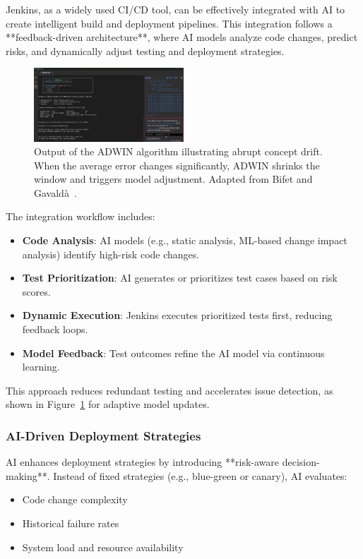\documentclass[manuscript,screen,review]{acmart}
\begin{document}
Jenkins, as a widely used CI/CD tool, can be effectively integrated with AI to create intelligent build and deployment pipelines. This integration follows a **feedback-driven architecture**, where AI models analyze code changes, predict risks, and dynamically adjust testing and deployment strategies.

\begin{figure}[H]
  \centering
  \includegraphics[width=0.5\textwidth]{picture/jenkins+ai+cursor.pdf}
  \caption{Output of the ADWIN algorithm illustrating abrupt concept drift. When the average error changes significantly, ADWIN shrinks the window and triggers model adjustment. Adapted from Bifet and Gavaldà~\cite{Bifet2007}.}
  \label{fig:adwin}
\end{figure}

The integration workflow includes:
\begin{itemize}
    \item \textbf{Code Analysis}: AI models (e.g., static analysis, ML-based change impact analysis) identify high-risk code changes.
    \item \textbf{Test Prioritization}: AI generates or prioritizes test cases based on risk scores.
    \item \textbf{Dynamic Execution}: Jenkins executes prioritized tests first, reducing feedback loops.
    \item \textbf{Model Feedback}: Test outcomes refine the AI model via continuous learning.
\end{itemize}

This approach reduces redundant testing and accelerates issue detection, as shown in Figure~\ref{fig:adwin} for adaptive model updates.

\subsubsection{AI-Driven Deployment Strategies}

AI enhances deployment strategies by introducing **risk-aware decision-making**. Instead of fixed strategies (e.g., blue-green or canary), AI evaluates:
\begin{itemize}
    \item Code change complexity
    \item Historical failure rates
    \item System load and resource availability
\end{itemize}
\end{document}
